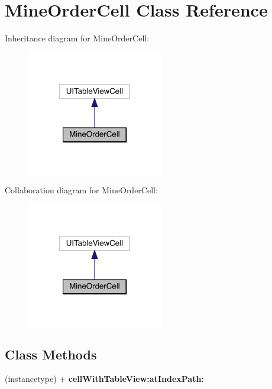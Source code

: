 \hypertarget{interface_mine_order_cell}{}\section{Mine\+Order\+Cell Class Reference}
\label{interface_mine_order_cell}


Inheritance diagram for Mine\+Order\+Cell\+:\nopagebreak
\begin{figure}[H]
\begin{center}
\leavevmode
\includegraphics[width=169pt]{interface_mine_order_cell__inherit__graph}
\end{center}
\end{figure}


Collaboration diagram for Mine\+Order\+Cell\+:\nopagebreak
\begin{figure}[H]
\begin{center}
\leavevmode
\includegraphics[width=169pt]{interface_mine_order_cell__coll__graph}
\end{center}
\end{figure}
\subsection*{Class Methods}
\begin{DoxyCompactItemize}
\item 
\mbox{\label{interface_mine_order_cell_a53ec412fc4eb597a131b313c0a4911e2}} 
(instancetype) + {\bfseries cell\+With\+Table\+View\+:at\+Index\+Path\+:}
\end{DoxyCompactItemize}
